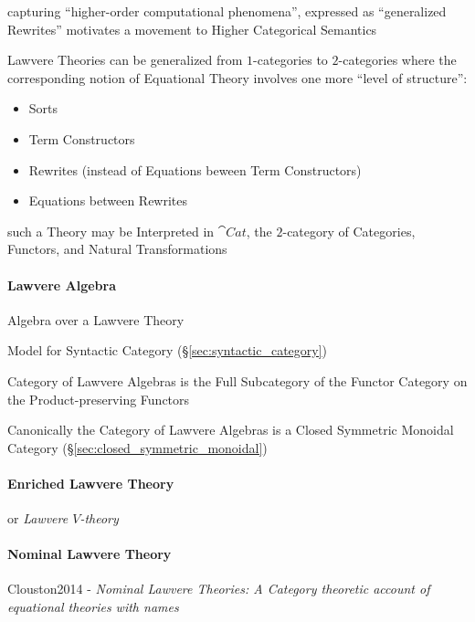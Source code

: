 capturing ``higher-order computational phenomena'', expressed as ``generalized
Rewrites'' motivates a movement to Higher Categorical Semantics

Lawvere Theories can be generalized from $1$-categories to $2$-categories where
the corresponding notion of Equational Theory involves one more ``level of
structure'':
\begin{itemize}
  \item Sorts
  \item Term Constructors
  \item Rewrites (instead of Equations beween Term Constructors)
  \item Equations between Rewrites
\end{itemize}

such a Theory may be Interpreted in $\cat{Cat}$, the $2$-category of Categories,
Functors, and Natural Transformations



\paragraph{Lawvere Algebra}\label{sec:lawvere_algebra}\hfill

Algebra over a Lawvere Theory

Model for Syntactic Category (\S\ref{sec:syntactic_category})

Category of Lawvere Algebras is the Full Subcategory of the Functor
Category on the Product-preserving Functors %

Canonically the Category of Lawvere Algebras is a Closed Symmetric
Monoidal Category (\S\ref{sec:closed_symmetric_monoidal})



\paragraph{Enriched Lawvere Theory}\label{sec:enriched_lawvere}\hfill
\cite{hyland-power06}

or \emph{Lawvere $V$-theory}



\paragraph{Nominal Lawvere Theory}\label{sec:nominal_lawvere_theory}\hfill

Clouston2014 - \emph{Nominal Lawvere Theories: A Category theoretic account of
  equational theories with names}

